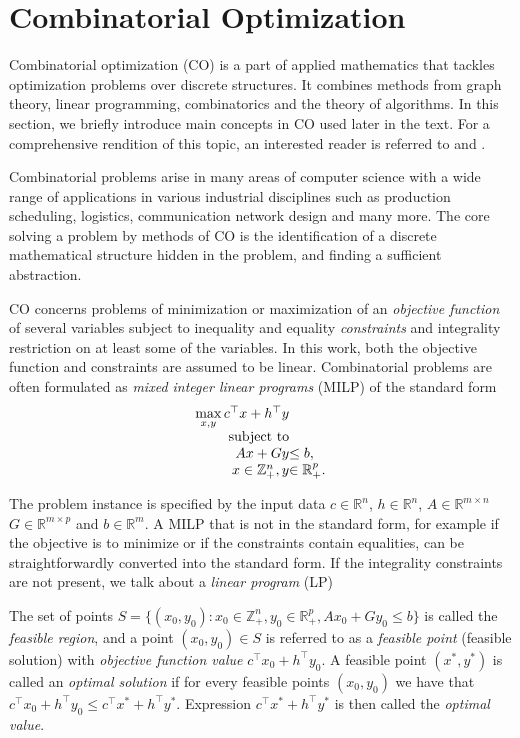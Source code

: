 \section{Combinatorial Optimization}

Combinatorial optimization (CO) is a part of applied mathematics that tackles optimization problems over discrete structures.
It combines methods from graph theory, linear programming, combinatorics and the theory of algorithms.
In this section, we briefly introduce main concepts in CO used later in the text.
For a comprehensive rendition of this topic, an interested reader is referred to \cite{wolsey98} and \cite{nemhauser88}.

Combinatorial problems arise in many areas of computer science with a wide range of applications in various industrial disciplines 
such as production scheduling, logistics, communication network design and many more.
The core solving a problem by methods of CO is the identification of a discrete mathematical structure hidden in the problem,
and finding a sufficient abstraction.

CO concerns problems of minimization or maximization of an \emph{objective function} of several variables 
subject to inequality and equality \emph{constraints} and integrality restriction on at least some of the variables.
In this work, both the objective function and constraints are assumed to be linear.
Combinatorial problems are often formulated as \emph{mixed integer linear programs} (MILP) of the standard form
\begin{equation}
\begin{array}{r@{}l}
	\max\limits_{x,y}c^\top x + h^\top y & \\
	\text{subject to}& \\
	  Ax + Gy &\leq b, \\
	  x \in \mathbb{Z}^{n}_+, y & \in\mathbb{R}^{p}_+. 
\end{array}
\end{equation}

The problem instance is specified by the input data $c\in \mathbb{R}^n$, $h \in \mathbb{R}^n$, $A \in \mathbb{R}^{m\times n}$  $G \in\mathbb{R}^{m\times p}$ and $b \in \mathbb{R}^m$.
A MILP that is not in the standard form, for example if the objective is to minimize or if the constraints contain equalities, can be straightforwardly converted into the standard form.
If the integrality constraints are not present, we talk about a \emph{linear program} (LP)


The set of points $S=\{(x_0,y_0):  x_0 \in \mathbb{Z}^{n}_+, y_0  \in\mathbb{R}^{p}_+, Ax_0 + Gy_0 \leq b\}$ is called the \emph{feasible region},  
and a point $(x_0,y_0)\in S$ is referred to as a \emph{feasible point} (feasible solution) with \emph{objective function value} $c^\top x_0 + h^\top y_0$. 
A feasible point $(x^*,y^*)$ is called an \emph{optimal solution} if for every feasible points $(x_0,y_0)$ we have that $c^\top x_0 + h^\top y_0 \leq c^\top x^* + h^\top y^*$. 
Expression $c^\top x^* + h^\top y^*$ is then called the \emph{optimal value}. 

